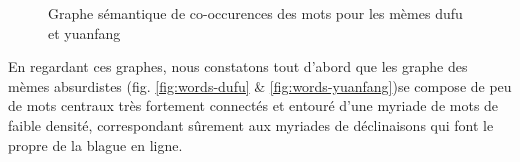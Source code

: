 \begin{figure}[h!t]
    \centering
    
  \caption{
    Graphe s\'emantique de co-occurences des mots pour les m\`emes dufu et yuanfang   
  }
\end{figure}

En regardant ces graphes, nous constatons tout d{\textquoteright}abord
que les graphe des m\`emes absurdistes (fig. \ref{fig:words-dufu} \& \ref{fig:words-yuanfang})se compose de peu de mots
centraux tr\`es fortement connect\'es et entour\'e
d{\textquoteright}une myriade de mots de faible densit\'e,
correspondant s\^urement aux myriades de d\'eclinaisons qui font le
propre de la blague en ligne. 

